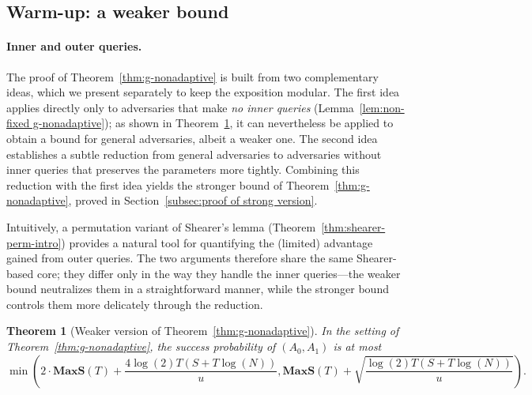 \documentclass[11pt]{article}
\newtheorem{theorem}{Theorem}[section]
\newcommand{\MAXS}{\boldsymbol{MaxS}}
\begin{document}


\subsection{Warm-up: a weaker bound}
\label{subsec:weaker bound}


\paragraph{Inner and outer queries.}
The proof of Theorem~\ref{thm:g-nonadaptive} is built from two complementary ideas, which we present separately to keep the exposition modular.
The first idea applies directly only to adversaries that make \emph{no inner queries} (Lemma~\ref{lem:non-fixed g-nonadaptive}); as shown in Theorem~\ref{thm:g-nonadaptive-weaker}, it can nevertheless be applied to obtain a bound for general adversaries, albeit a weaker one.
The second idea establishes a subtle reduction from general adversaries to adversaries without inner queries that preserves the parameters more tightly.
Combining this reduction with the first idea yields the stronger bound of Theorem~\ref{thm:g-nonadaptive}, proved in Section~\ref{subsec:proof of strong version}.

Intuitively, a permutation variant of Shearer’s lemma (Theorem~\ref{thm:shearer-perm-intro}) provides a natural tool for quantifying the (limited) advantage gained from outer queries.
The two arguments therefore share the same Shearer-based core; they differ only in the way they handle the inner queries—the weaker bound neutralizes them in a straightforward manner, while the stronger bound controls them more delicately through the reduction.

\begin{theorem}[Weaker version of Theorem~\ref{thm:g-nonadaptive}] 
\label{thm:g-nonadaptive-weaker}
In the setting of Theorem~\ref{thm:g-nonadaptive}, the success probability of $(A_0,A_1)$ is at most
\[
\min \left(2\cdot \MAXS(T) + \frac{4\log(2) T (S+T \log(N))}{u}, \MAXS(T) + 
\sqrt{\frac{\log(2) T (S+T \log(N))} {{u}}} \right).
\]
\end{theorem}
\end{document}

